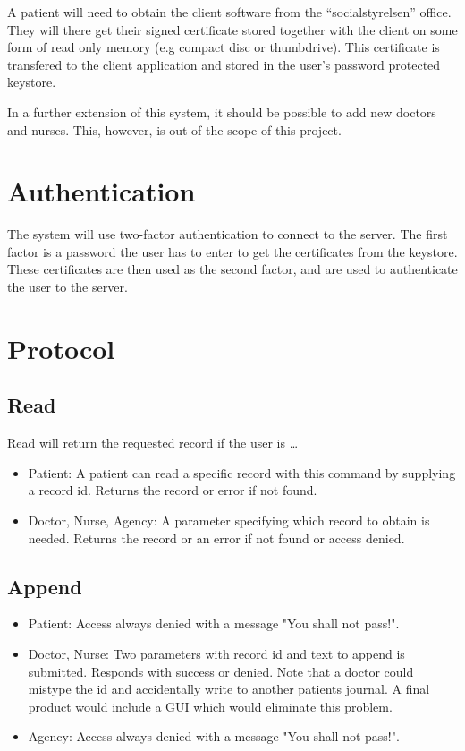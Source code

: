 \documentclass[10pt, a4paper]{article}
\begin{document}
A patient will need to obtain the client software from the ``socialstyrelsen'' office. They will there get their signed certificate stored together with the client on some form of read only memory (e.g compact disc or thumbdrive). This certificate is transfered to the client application and stored in the user's password protected keystore. 

In a further extension of this system, it should be possible to add new doctors and nurses. This, however, is out of the scope of this project.

\section{Authentication}
The system will use two-factor authentication to connect to the server. The first factor is a password the user has to enter to get the certificates from the keystore. These certificates are then used as the second factor, and are used to authenticate the user to the server.


\section{Protocol}
\subsection{Read}
Read will return the requested record if the user is \ldots
\begin{itemize}
	\item Patient: A patient can read a specific record with this command by supplying a record id. Returns the record or error if not found.
	\item Doctor, Nurse, Agency: A parameter specifying which record to obtain is needed. Returns the record or an error if not found or access denied.
\end{itemize}

\subsection{Append}
\begin{itemize}
\item Patient: Access always denied with a message "You shall not pass!".
\item Doctor, Nurse: Two parameters with record id and text to append is submitted. Responds with success or denied. Note that a doctor could mistype the id and accidentally write to another patients journal. A final product would include a GUI which would eliminate this problem.
\item Agency: Access always denied with a message "You shall not pass!".
\end{itemize}
\end{document}
